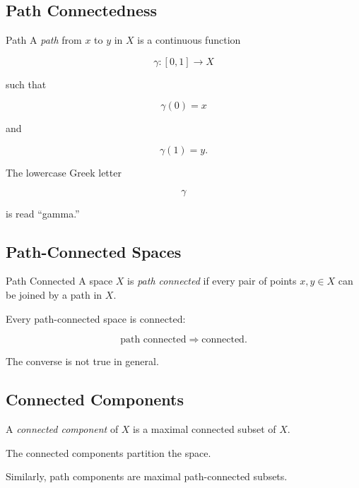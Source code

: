 \subsection{Path Connectedness}
\label{subsec:path-connectedness}

\begin{definitionbox}{Path}
A \emph{path} from \(x\) to \(y\) in \(X\) is a continuous function

\[
\boxed{
\gamma:[0,1]\to X
}
\]

such that

\[
\gamma(0)=x
\]

and

\[
\gamma(1)=y.
\]
\end{definitionbox}

The lowercase Greek letter

\[
\gamma
\]

is read ``gamma.''

\subsection{Path-Connected Spaces}
\label{subsec:path-connected-spaces}

\begin{definitionbox}{Path Connected}
A space \(X\) is \emph{path connected} if every pair of points
\(x,y\in X\) can be joined by a path in \(X\).
\end{definitionbox}

Every path-connected space is connected:

\[
\boxed{
\text{path connected}
\Longrightarrow
\text{connected}.
}
\]

The converse is not true in general.

\subsection{Connected Components}
\label{subsec:connected-components}

A \emph{connected component} of \(X\) is a maximal connected subset of \(X\).

The connected components partition the space.

Similarly, path components are maximal path-connected subsets.

